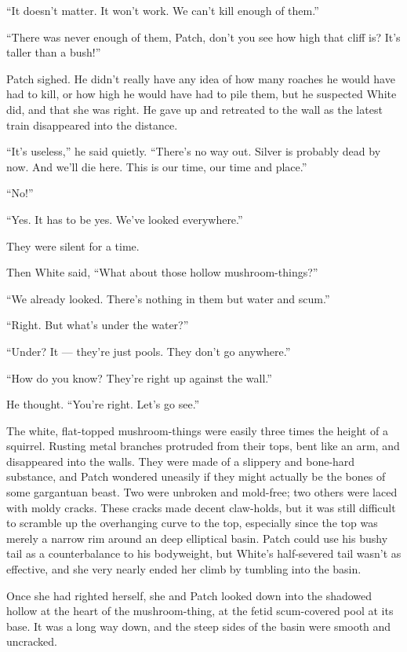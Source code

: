 \documentclass[ebook,oneside,openany,17pt]{memoir}
\begin{document}
“It doesn’t matter. It won’t work. We can’t kill enough of them.”

“There was never enough of them, Patch, don’t you see how high that
cliff is? It’s taller than a bush!”

Patch sighed. He didn’t really have any idea of how many roaches he
would have had to kill, or how high he would have had to pile them,
but he suspected White did, and that she was right. He gave up and
retreated to the wall as the latest train disappeared into the
distance.

“It’s useless,” he said quietly. “There’s no way out. Silver is
probably dead by now. And we’ll die here. This is our time, our time
and place.”

“No!”

“Yes. It has to be yes. We’ve looked everywhere.”

They were silent for a time.

Then White said, “What about those hollow mushroom-things?”

“We already looked. There’s nothing in them but water and scum.”

“Right. But what’s under the water?”

“Under? It — they’re just pools. They don’t go anywhere.”

“How do you know? They’re right up against the wall.”

He thought. “You’re right. Let’s go see.”

The white, flat-topped mushroom-things were easily three times the
height of a squirrel. Rusting metal branches protruded from their
tops, bent like an arm, and disappeared into the walls. They were made
of a slippery and bone-hard substance, and Patch wondered uneasily if
they might actually be the bones of some gargantuan beast. Two were
unbroken and mold-free; two others were laced with moldy cracks. These
cracks made decent claw-holds, but it was still difficult to scramble
up the overhanging curve to the top, especially since the top was
merely a narrow rim around an deep elliptical basin. Patch could use
his bushy tail as a counterbalance to his bodyweight, but White’s
half-severed tail wasn’t as effective, and she very nearly ended her
climb by tumbling into the basin.

Once she had righted herself, she and Patch looked down into the
shadowed hollow at the heart of the mushroom-thing, at the fetid
scum-covered pool at its base. It was a long way down, and the steep
sides of the basin were smooth and uncracked.
\end{document}
